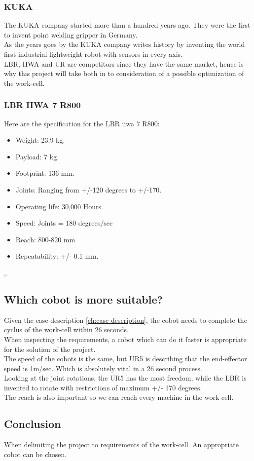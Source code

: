 \subsubsection{KUKA}

The KUKA company started more than a hundred years ago. They were the first to invent point welding gripper in Germany.\\
As the years goes by the KUKA company writes history by inventing the world first industrial lightweight robot with sensors in every axis.\\

LBR, IIWA and UR are competitors since they have the same market, hence is why this project will take both in to consideration of a possible optimization of the work-cell\cite{KukaHist}.\\


\subsubsection{LBR IIWA 7 R800}

Here are the specification for the LBR iiwa 7 R800:\\

\begin{itemize}
    \item Weight: 23.9 kg.
    \item Payload: 7 kg.
    \item Footprint: 136 mm.
    \item Joints: Ranging from +/-120 degrees to +/-170.
    \item Operating life: 30,000 Hours.
    \item Speed: Joints = 180 degrees/sec
    \item Reach: 800-820 mm
    \item Repeatability: +/- 0.1 mm.
\end{itemize}
\cite{KukaSpec1},\cite{KukaSpec2}.

\subsection{Which cobot is more suitable?}

Given the case-description \ref{ch:case description}, the cobot needs to complete the cyclus of the work-cell within 26 seconds.\\
When inspecting the requirements, a cobot which can do it faster is appropriate for the solution of the project.\\
The speed of the cobots is the same, but UR5 is describing that the end-effector speed is 1m/sec. Which is absolutely vital in a 26 second process.\\
Looking at the joint rotations, the UR5 has the most freedom, while the LBR is invented to rotate with restrictions of maximum +/- 170 degrees.\\
The reach is also important so we can reach every machine in the work-cell.\\

\subsection{Conclusion}
When delimiting the project to requirements of the work-cell. An appropriate cobot can be chosen.\\

